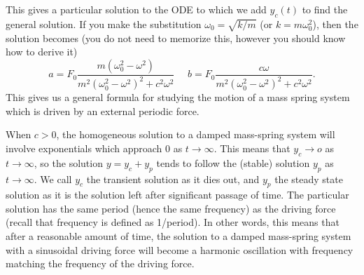 This gives a particular solution to the ODE to which we add $y_c(t)$ to find the general solution. If you make the substitution $\omega_0=\sqrt{k/m}$ (or $k=m\omega_0^2$), then the solution becomes (you do not need to memorize this, however you should know how to derive it)
$$a=F_0\frac{m(\omega_0^2-\omega^2)}{m^2(\omega_0^2-\omega^2)^2+c^2\omega^2}\ \ \ \ \ \ b=F_0\frac{c\omega}{m^2(\omega_0^2-\omega^2)^2+c^2\omega^2}.$$
This gives us a general formula for studying the motion of a mass spring system which is driven by an external periodic force.

\begin{observation}
When $c>0$, the homogeneous solution to a damped mass-spring system will involve exponentials which approach 0 as $t\to \infty$. This means that $y_c\to o$ as $t\to \infty$, so the solution $y=y_c+y_p$ tends to follow the (stable) solution $y_p$ as $t\to\infty$. We call $y_c$ the transient solution as it dies out, and $y_p$ the steady state solution as it is the solution left after significant passage of time. The particular solution has the same period (hence the same frequency) as the driving force (recall that frequency is defined as 1/period). In other words, this means that after a reasonable amount of time, the solution to a damped mass-spring system with a sinusoidal driving force will become a harmonic oscillation with frequency matching the frequency of the driving force.
\end{observation}

